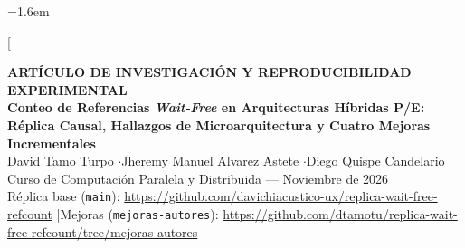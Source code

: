 \documentclass[10pt,twocolumn,a4paper]{article}
\begin{document}
\emergencystretch=1.6em

\twocolumn[{%
\begin{@twocolumnfalse}
\begin{center}
  {\small\color{acento}\textbf{ARTÍCULO DE INVESTIGACIÓN Y REPRODUCIBILIDAD EXPERIMENTAL}}\\[4pt]
  {\LARGE\bfseries Conteo de Referencias \emph{Wait-Free} en Arquitecturas Híbridas P/E:\\
  Réplica Causal, Hallazgos de Microarquitectura y Cuatro Mejoras Incrementales}\\[8pt]
  {\normalsize David Tamo Turpo \quad$\cdot$\quad Jheremy Manuel Alvarez Astete \quad$\cdot$\quad Diego Quispe Candelario}\\[3pt]
  {\footnotesize Curso de Computación Paralela y Distribuida --- Noviembre de 2026}\\
  {\footnotesize Réplica base (\texttt{main}): \url{https://github.com/davichiacustico-ux/replica-wait-free-refcount} \quad|\quad Mejoras (\texttt{mejoras-autores}): \url{https://github.com/dtamotu/replica-wait-free-refcount/tree/mejoras-autores}}
\end{center}
\vspace{4pt}


\end{@twocolumnfalse}}
\end{document}
